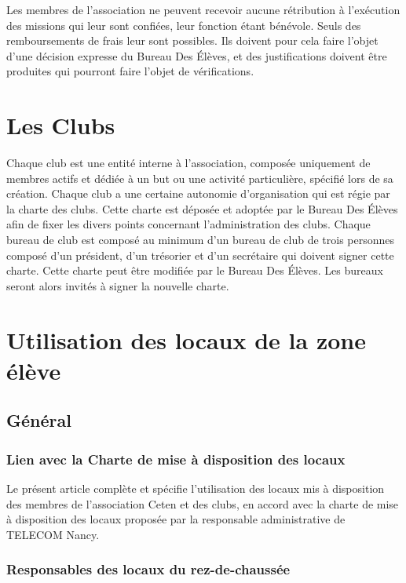 \documentclass{article} %
\begin{document}
			Les membres de l’association ne peuvent recevoir aucune rétribution
			à l'exécution des missions qui leur sont confiées, leur fonction
			étant bénévole. Seuls des remboursements de frais leur sont
			possibles. Ils doivent pour cela faire l'objet d'une décision
			expresse du Bureau Des Élèves, et des justifications doivent être
			produites qui pourront faire l'objet de vérifications.

	\section{Les Clubs}

		Chaque club est une entité interne à l’association, composée uniquement de
		membres actifs et dédiée à un but ou une activité particulière, spécifié lors
		de sa création.	Chaque club a une certaine autonomie d'organisation qui est
		régie par la charte des clubs. Cette charte est déposée et adoptée par le
		Bureau Des Élèves afin de fixer les divers points concernant l’administration
		des clubs. Chaque bureau de club est composé au minimum d’un bureau de club
		de trois personnes composé d’un président, d’un trésorier et d’un secrétaire
		qui doivent signer cette charte. Cette charte peut être modifiée par le
		Bureau Des Élèves. Les bureaux seront alors invités à signer la nouvelle
		charte.

	\section{Utilisation des locaux de la zone élève}
		
		\subsection{Général}

			\subsubsection{Lien avec la Charte de mise à disposition des locaux}

				Le présent article complète et spécifie l’utilisation des locaux
				mis à disposition des membres de l’association Ceten et des
				clubs, en accord avec la charte de mise à disposition des locaux
				proposée par la responsable administrative de TELECOM
				Nancy.

			\subsubsection{Responsables des locaux du rez-de-chaussée}
\end{document}
